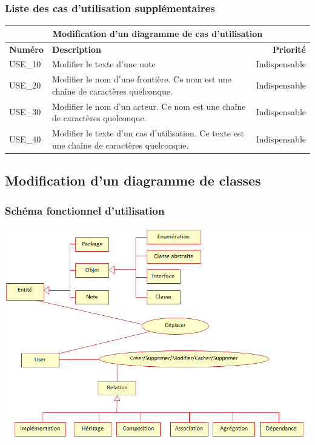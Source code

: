 \documentclass[hidelinks, 10pt,a4paper]{article}
\begin{document}
\subsubsection{Liste des cas d’utilisation supplémentaires}
\begin{center}
    \begin{tabular}{|l|p{8cm}|r|}
        \hline\multicolumn{3}{|c|}{Modification d’un diagramme de cas d’utilisation} \\\hline
        {\textbf{Numéro}} & {\textbf{Description}} & {\textbf{Priorité}}\\\hline
        {USE\_10} & {Modifier le texte d’une note} & {Indispensable} \\\hline
        {USE\_20} & {Modifier le nom d’une frontière. Ce nom est une chaîne de caractères quelconque.} & {Indispensable} \\\hline
        {USE\_30} & {Modifier le nom d’un acteur. Ce nom est une chaîne de caractères quelconque.} & {Indispensable} \\\hline
        {USE\_40} & {Modifier le texte d’un cas d’utilisation. Ce texte est une chaîne de caractères quelconque.} & {Indispensable} \\\hline
    \end{tabular}
\end{center}

\subsection{Modification d’un diagramme de classes}
  \subsubsection{Schéma fonctionnel d’utilisation}
    \begin{center}
	\includegraphics[width=14cm]{imgSTB/E-R-Class.png}
    \end{center}
\end{document}
